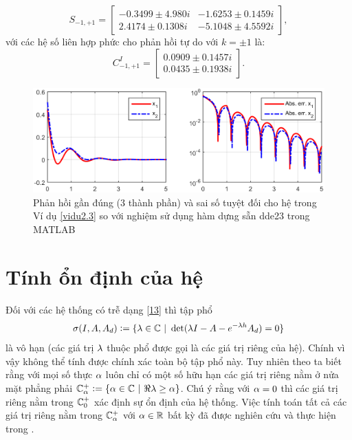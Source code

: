 \begin{vd}
	\begin{equation*}
	S_{-1,+1}=\begin{bmatrix}
	-0.3499\pm 4.980i&-1.6253\pm 0.1459i\\
	2.4174\pm 0.1308i&-5.1048\pm 4.5592i
	\end{bmatrix},
	\end{equation*}
	với các hệ số liên hợp phức cho phản hồi tự do với $k = \pm 1$ là:
	\begin{equation*}
	C^I_{-1,+1}=
	\begin{bmatrix}
	0.0909\pm 0.1457i\\
	0.0435\pm 0.1938i
	\end{bmatrix}.
	\end{equation*}
\end{vd}

\begin{figure}
	\includegraphics[scale=0.55]{hinh/hinh3_new.png}
	\caption{Phản hồi gần đúng (3 thành phần) và sai số tuyệt đối cho hệ trong Ví dụ \ref{vidu2.3}
	so với nghiệm sử dụng hàm dựng sẵn dde23 trong MATLAB}
	\label{refhinh3}
\end{figure}


\section{Tính ổn định của hệ}
%
Đối với các hệ thống có trễ dạng \eqref{13} thì tập phổ
%
\begin{equation}\label{spectrum}
\sigma(I,A,A_d) := \{\lambda \in \mathbb{C} \ | \ \det(\lambda I - A - e^{-\lambda h}A_d ) = 0\}
\end{equation}
%
là vô hạn (các giá trị $\lambda$ thuộc phổ được gọi là các giá trị riêng của hệ). Chính vì vậy không thể tính được chính xác toàn bộ tập phổ này. Tuy nhiên theo \cite{Hal63} ta biết rằng với mọi số thực $\alpha$ luôn chỉ có một số hữu hạn các giá trị riêng nằm ở nửa mặt phẳng phải 
$\mathbb{C}^+_{\alpha}:= \{ \alpha \in \mathbb{C} \ | \ \Re{\lambda}\geq \alpha \}$.
Chú ý rằng với $\alpha=0$ thì các giá trị riêng nằm trong $\mathbb{C}^+_{0}$ xác định sự ổn định của hệ thống. Việc tính toán tất cả các giá trị riêng nằm trong $\mathbb{C}^+_{\alpha}$ với $\alpha\in \mathbb{R}$ bất kỳ đã được nghiên cứu và thực hiện trong \cite{Eng01}. \\

